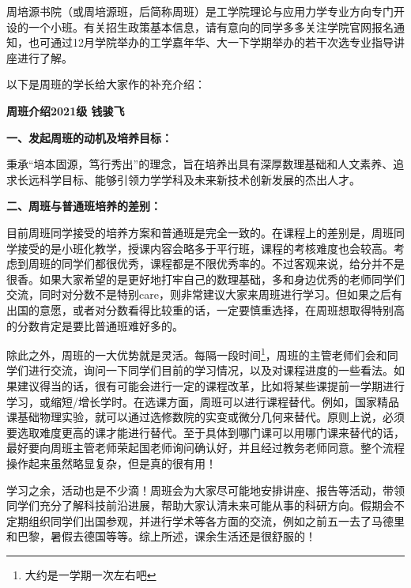 \documentclass[11pt,oneside]{book}
\begin{document}
周培源书院（或周培源班，后简称周班）是工学院理论与应用力学专业方向专门开设的一个小班。有关招生政策基本信息，请有意向的同学多多关注学院官网报名通知，也可通过12月学院举办的工学嘉年华、大一下学期举办的若干次选专业指导讲座进行了解。

\vspace{10pt}

以下是周班的学长给大家作的补充介绍：

\textbf{周班介绍\quad 2021级 钱骏飞}

\vspace{10pt}

\textbf{\textbf{一、发起周班的动机及培养目标：}}

秉承“培本固源，笃行秀出”的理念，旨在培养出具有深厚数理基础和人文素养、追求长远科学目标、能够引领力学学科及未来新技术创新发展的杰出人才。

\vspace{10pt}

\textbf{\textbf{二、周班与普通班培养的差别：}}

目前周班同学接受的培养方案和普通班是完全一致的。在课程上的差别是，周班同学接受的是小班化教学，授课内容会略多于平行班，课程的考核难度也会较高。考虑到周班的同学们都很优秀，课程都是不限优秀率的。不过客观来说，给分并不是很香。如果大家希望的是更好地打牢自己的数理基础，多和身边优秀的老师同学们交流，同时对分数不是特别care，则非常建议大家来周班进行学习。但如果之后有出国的意愿，或者对分数看得比较重的话，一定要慎重选择，在周班想取得特别高的分数肯定是要比普通班难好多的。

\vspace{10pt}

除此之外，周班的一大优势就是灵活。每隔一段时间\footnote{大约是一学期一次左右吧}，周班的主管老师们会和同学们进行交流，询问一下同学们目前的学习情况，以及对课程进度的一些看法。如果建议得当的话，很有可能会进行一定的课程改革，比如将某些课提前一学期进行学习，或缩短/增长学时。在选课方面，周班可以进行课程替代。例如，国家精品课基础物理实验，就可以通过选修数院的实变或微分几何来替代。原则上说，必须要选取难度更高的课才能进行替代。至于具体到哪门课可以用哪门课来替代的话，最好要向周班主管老师荣起国老师询问确认好，并且经过教务老师同意。整个流程操作起来虽然略显复杂，但是真的很有用！

\vspace{10pt}

学习之余，活动也是不少滴！周班会为大家尽可能地安排讲座、报告等活动，带领同学们充分了解科技前沿进展，帮助大家认清未来可能从事的科研方向。假期会不定期组织同学们出国参观，并进行学术等各方面的交流，例如之前五一去了马德里和巴黎，暑假去德国等等。综上所述，课余生活还是很舒服的！
\end{document}
